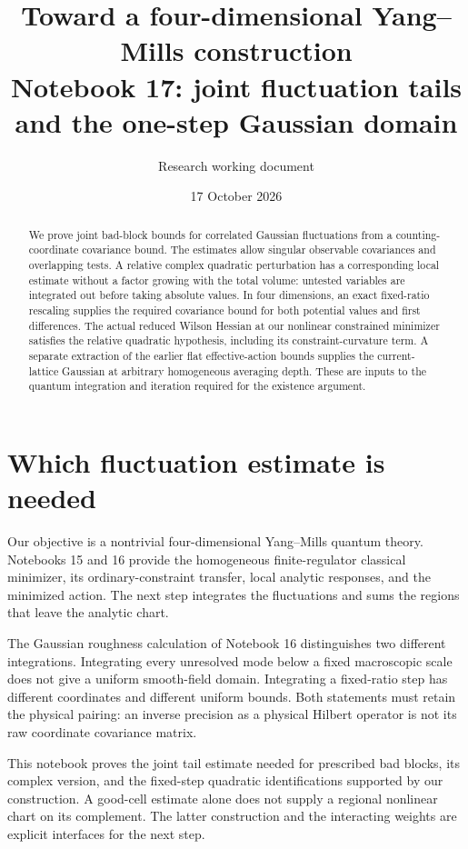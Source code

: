 \documentclass[11pt]{article}
\title{Toward a four-dimensional Yang--Mills construction\\
\large Notebook 17: joint fluctuation tails and the one-step Gaussian domain}
\author{Research working document}
\date{17 October 2026}
\theoremstyle{remark}
\begin{document}
\maketitle
\begin{abstract}
We prove joint bad-block bounds for correlated Gaussian fluctuations
from a counting-coordinate covariance bound. The estimates allow
singular observable covariances and overlapping tests. A relative
complex quadratic perturbation has a corresponding local estimate
without a factor growing with the total volume: untested variables
are integrated out before taking absolute values. In four dimensions,
an exact fixed-ratio rescaling supplies the required covariance bound
for both potential values and first differences. The actual reduced
Wilson Hessian at our nonlinear constrained minimizer satisfies the
relative quadratic hypothesis, including its constraint-curvature
term. A separate extraction of the earlier flat effective-action
bounds supplies the current-lattice Gaussian at arbitrary homogeneous
averaging depth. These are inputs to the quantum integration and
iteration required for the existence argument.
\end{abstract}

\section{Which fluctuation estimate is needed}
\label{gs17-target}

Our objective is a nontrivial four-dimensional Yang--Mills quantum
theory. Notebooks 15 and 16 provide the homogeneous finite-regulator
classical minimizer, its ordinary-constraint transfer, local analytic
responses, and the minimized action. The next step integrates the
fluctuations and sums the regions that leave the analytic chart.

The Gaussian roughness calculation of Notebook 16 distinguishes two
different integrations. Integrating every unresolved mode below a
fixed macroscopic scale does not give a uniform smooth-field domain.
Integrating a fixed-ratio step has different coordinates and different
uniform bounds. Both statements must retain the physical pairing:
an inverse precision as a physical Hilbert operator is not its raw
coordinate covariance matrix.

This notebook proves the joint tail estimate needed for prescribed
bad blocks, its complex version, and the fixed-step quadratic
identifications supported by our construction. A good-cell estimate
alone does not supply a regional nonlinear chart on its complement.
The latter construction and the interacting weights are explicit
interfaces for the next step.
\end{document}
